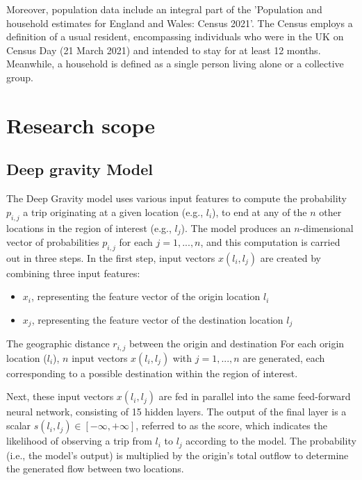     Moreover, population data include an integral part of the 'Population and household estimates for England and Wales: Census 2021'. The Census employs a definition of a usual resident, encompassing individuals who were in the UK on Census Day (21 March 2021) and intended to stay for at least 12 months. Meanwhile, a household is defined as a single person living alone or a collective group.

    \section{Research scope}

        \subsection{Deep gravity Model}


The Deep Gravity model uses various input features to compute the probability $p_{i,j}$ a trip originating at a given location (e.g., $l_i$), to end at any of the $n$ other locations in the region of interest (e.g., $l_j$). The model produces an $n$-dimensional vector of probabilities $p_{i,j}$ for each $j = 1, ..., n$, and this computation is carried out in three steps.
In the first step, input vectors $x(l_i, l_j)$ are created by combining three input features:

\begin{itemize}
        \item $x_i$, representing the feature vector of the origin location $l_i$
        \item $x_j$, representing the feature vector of the destination location $l_j$
\end{itemize}
The geographic distance $r_{i,j}$ between the origin and destination
For each origin location ($l_i$), $n$ input vectors $x(l_i, l_j)$ with $j = 1, ..., n$ are generated, each corresponding to a possible destination within the region of interest.

Next, these input vectors $x(l_i, l_j)$ are fed in parallel into the same feed-forward neural network, consisting of 15 hidden layers. The output of the final layer is a scalar $s(l_i, l_j) \in [-\infty, +\infty]$, referred to as the score, which indicates the likelihood of observing a trip from $l_i$ to $l_j$ according to the model. The probability (i.e., the model's output) is multiplied by the origin's total outflow to determine the generated flow between two locations.

